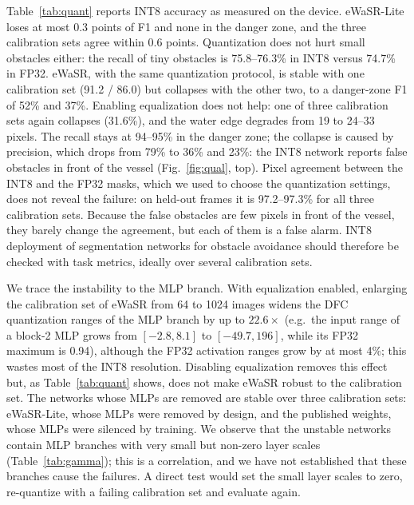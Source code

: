 \documentclass[conference]{IEEEtran}
\begin{document}
Table~\ref{tab:quant} reports INT8 accuracy as measured on the device. eWaSR-Lite loses at most 0.3 points of F1 and none in the danger zone, and the three calibration sets agree within 0.6 points. Quantization does not hurt small obstacles either: the recall of tiny obstacles is 75.8--76.3\% in INT8 versus 74.7\% in FP32. eWaSR, with the same quantization protocol, is stable with one calibration set (91.2 / 86.0) but collapses with the other two, to a danger-zone F1 of 52\% and 37\%. Enabling equalization does not help: one of three calibration sets again collapses (31.6\%), and the water edge degrades from 19 to 24--33 pixels. The recall stays at 94--95\% in the danger zone; the collapse is caused by precision, which drops from 79\% to 36\% and 23\%: the INT8 network reports false obstacles in front of the vessel (Fig.~\ref{fig:qual}, top). Pixel agreement between the INT8 and the FP32 masks, which we used to choose the quantization settings, does not reveal the failure: on held-out frames it is 97.2--97.3\% for all three calibration sets. Because the false obstacles are few pixels in front of the vessel, they barely change the agreement, but each of them is a false alarm. INT8 deployment of segmentation networks for obstacle avoidance should therefore be checked with task metrics, ideally over several calibration sets.

We trace the instability to the MLP branch. With equalization enabled, enlarging the calibration set of eWaSR from 64 to 1024 images widens the DFC quantization ranges of the MLP branch by up to $22.6\times$ (e.g.\ the input range of a block-2 MLP grows from $[-2.8, 8.1]$ to $[-49.7, 196]$, while its FP32 maximum is 0.94), although the FP32 activation ranges grow by at most 4\%; this wastes most of the INT8 resolution. Disabling equalization removes this effect but, as Table~\ref{tab:quant} shows, does not make eWaSR robust to the calibration set. The networks whose MLPs are removed are stable over three calibration sets: eWaSR-Lite, whose MLPs were removed by design, and the published weights, whose MLPs were silenced by training. We observe that the unstable networks contain MLP branches with very small but non-zero layer scales (Table~\ref{tab:gamma}); this is a correlation, and we have not established that these branches cause the failures. A direct test would set the small layer scales to zero, re-quantize with a failing calibration set and evaluate again.
\end{document}
